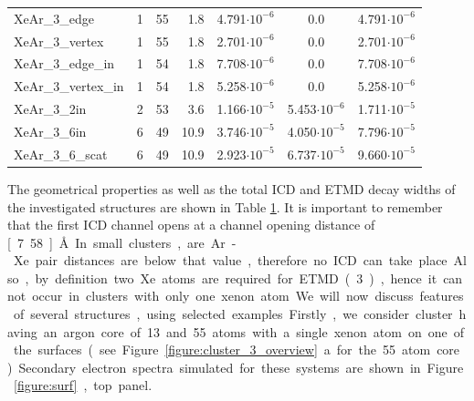 \begin{table}[h]
\begin{tabular}{lrrrccc}
XeAr\_3\_edge        &      1   &     55   &  1.8  & 4.791$\cdot 10^{-6}$ & 0.0                  & 4.791$\cdot 10^{-6}$ \\
XeAr\_3\_vertex      &      1   &     55   &  1.8  & 2.701$\cdot 10^{-6}$ & 0.0                  & 2.701$\cdot 10^{-6}$ \\
XeAr\_3\_edge\_in    &      1   &     54   &  1.8  & 7.708$\cdot 10^{-6}$ & 0.0                  & 7.708$\cdot 10^{-6}$ \\
XeAr\_3\_vertex\_in  &      1   &     54   &  1.8  & 5.258$\cdot 10^{-6}$ & 0.0                  & 5.258$\cdot 10^{-6}$ \\
XeAr\_3\_2in         &      2   &     53   &  3.6  & 1.166$\cdot 10^{-5}$ & 5.453$\cdot 10^{-6}$ & 1.711$\cdot 10^{-5}$ \\
XeAr\_3\_6in         &      6   &     49   & 10.9  & 3.746$\cdot 10^{-5}$ & 4.050$\cdot 10^{-5}$ & 7.796$\cdot 10^{-5}$ \\
XeAr\_3\_6\_scat     &      6   &     49   & 10.9  & 2.923$\cdot 10^{-5}$ & 6.737$\cdot 10^{-5}$ & 9.660$\cdot 10^{-5}$ \\
\bottomrule
\end{tabular}
\label{table:theo_gammas}
\end{table}
%
The geometrical properties as well as the total ICD and ETMD decay widths
of the investigated structures are shown in Table \ref{table:theo_gammas}.
It is important to remember that the first ICD channel opens at a
channel opening distance of \unit[7.58]{\AA}. In small
clusters, are Ar-Xe pair distances are below that value, therefore 
no ICD can take place. Also, by definition two Xe atoms are
required for ETMD(3), hence it cannot occur in clusters with only one xenon atom.
%

We will now discuss features of several structures, using selected examples.

Firstly, we consider cluster having an argon core of 13 and 55 atoms with a single xenon
atom on one of the surfaces (see Figure \ref{figure:cluster_3_overview}a
for the 55 atom core).
Secondary electron spectra simulated for these systems are shown in Figure \ref{figure:surf}, top panel.

